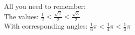 \documentclass[preview]{standalone}
\begin{document}
\begin{center}
All you need to remember: \\ The values: $\frac{1}{2} < \frac{\sqrt{2}}{2} < \frac{\sqrt{3}}{2}$ \\ With corresponding angles: $ \frac{1}{6} \pi < \frac{1}{4} \pi < \frac{1}{3} \pi $
\end{center}
\end{document}
